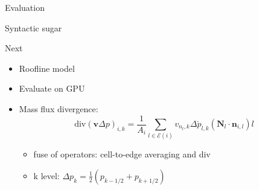 \documentclass{beamer}
\begin{document}
\begin{frame}{Evaluation}
\end{frame}

\begin{frame}{Syntactic sugar}
\end{frame}

\begin{frame}{Next}
  \begin{itemize}
    \item Roofline model
    \item Evaluate on GPU
    \item Mass flux divergence:
      \begin{equation*}
        \text{div}(\bm{v}\Delta p)_{i, k}=\frac{1}{A_i} \sum\limits_{l\in\mathcal{E}(i)}v_{n_l,k}\Delta\breve{p}_{l,k}(\bm{N}_l\cdot\bm{n}_{i,l})l
      \end{equation*}
      \begin{itemize}
        \item fuse of operators: cell-to-edge averaging and div
        \item k level: $\Delta p_k = \frac{1}{2}(p_{k-1/2}+p_{k+1/2})$
      \end{itemize}
  \end{itemize}
\end{frame}
\end{document}
